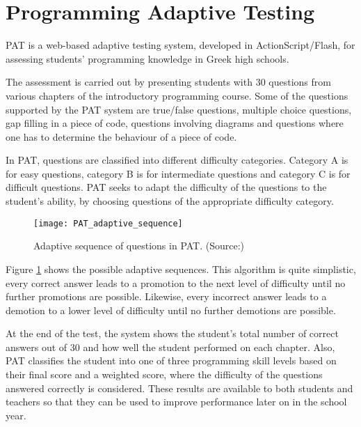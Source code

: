 \section{Programming Adaptive Testing}
\label{sec:PAT}
PAT\cite{PAT} is a web-based adaptive testing system, developed in ActionScript/Flash, for assessing students' programming knowledge in Greek high schools. \newline

The assessment is carried out by presenting students with 30 questions from various chapters of the introductory programming course. Some of the questions supported by the PAT system are true/false questions, multiple choice questions, gap filling in a piece of code, questions involving diagrams and questions where one has to determine the behaviour of a piece of code.\newline

In PAT, questions are classified into different difficulty categories. Category A is for easy questions, category B is for intermediate questions and category C is for difficult questions. PAT seeks to adapt the difficulty of the questions to the student's ability, by choosing questions of the appropriate difficulty category.

\begin{figure}[H]
\centering
\texttt{[image: PAT\_adaptive\_sequence]}
\caption{Adaptive sequence of questions in PAT. (Source:\cite{PAT})}
\label{fig:PAT_adaptive_sequence}
\end{figure}

Figure \ref{fig:PAT_adaptive_sequence} shows the possible adaptive sequences. This algorithm is quite simplistic, every correct answer leads to a promotion to the next level of difficulty until no further promotions are possible. Likewise, every incorrect answer leads to a demotion to a lower level of difficulty until no further demotions are possible.\newline

At the end of the test, the system shows the student's total number of correct answers out of 30 and how well the student performed on each chapter. Also, PAT classifies the student into one of three programming skill levels based on their final score and a weighted score, where the difficulty of the questions answered correctly is considered. These results are available to both students and teachers so that they can be used to improve performance later on in the school year.\newline

